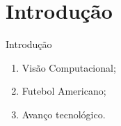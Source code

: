 \section{Introdução}

\begin{frame}{Introdução}

\begin{enumerate}
 \item {Visão Computacional;}
 \item {Futebol Americano;}
 \item {Avanço tecnológico.}
\end{enumerate}

\end{frame}